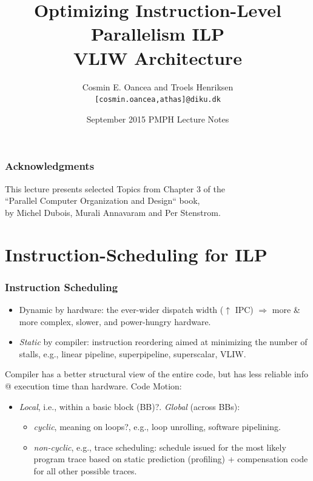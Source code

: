 \documentclass{beamer}
\title[VLIW Arch]{Optimizing Instruction-Level Parallelism ILP\\VLIW Architecture}
\author[C.~Oancea]{Cosmin E. Oancea and Troels Henriksen\\{\tt [cosmin.oancea,athas]@diku.dk}}
\institute{Department of Computer Science (DIKU)\\University of Copenhagen}
\date[Sept 2015]{September 2015 PMPH Lecture Notes}
\renewcommand{\emph}[1]{\textcolor{structure}{#1}}
\newcommand{\emp}[1]{\textcolor{DikuRed}{ #1}}
\begin{document}
\titleslide



\begin{frame}
\frametitle{Acknowledgments}
This lecture presents selected Topics from Chapter 3 of the\\
``Parallel Computer Organization and Design`` book,\\
by Michel Dubois, Murali Annavaram and Per Stenstrom.
\end{frame}


\begin{frame}[fragile]
	\tableofcontents
\end{frame}


\section{Instruction-Scheduling for ILP}


\begin{frame}[fragile,t]
\frametitle{Instruction Scheduling}

\begin{itemize}
    \item {Dynamic} by hardware: the ever-wider dispatch width
            ($\uparrow$ IPC) $\Rightarrow$ 
            more \& more complex, slower, and power-hungry hardware. \smallskip
 
    \item {\em Static} by compiler: instruction reordering aimed at
            minimizing the number of stalls,
            e.g., linear pipeline, superpipeline, superscalar, VLIW.  
\end  {itemize}
\pause\bigskip

Compiler has a better structural view of the entire code, but has less reliable info 
@ execution time than hardware. Code Motion:
\smallskip
\begin{itemize}
    \item \emph{\em Local}, i.e., within a \alert{basic block (BB)?}. \emph{\em Global} (across BBs): 
    \begin{itemize}
        \item \emp{\em cyclic}, meaning on \alert{loops?}, e.g., loop unrolling, software pipelining.
        \item \emp{\em non-cyclic}, e.g., trace scheduling: schedule issued for the most likely 
                program trace based on static prediction (profiling) + compensation code 
                for all other possible traces.
    \end  {itemize}
\end  {itemize}

\end{frame}
\end{document}
